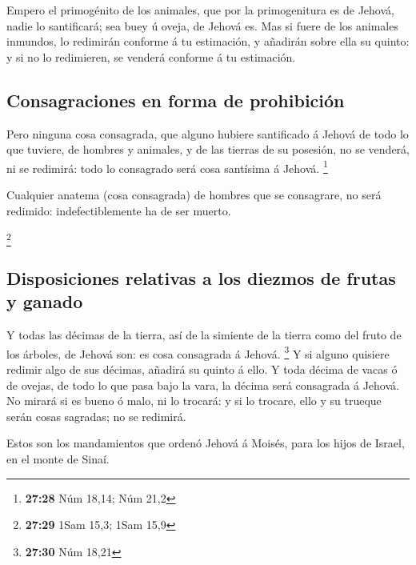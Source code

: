  Empero el primogénito de los animales, que por la
primogenitura es de Jehová, nadie lo santificará; sea buey ú oveja, de
Jehová es.  Mas si fuere de los animales inmundos, lo
redimirán conforme á tu estimación, y añadirán sobre ella su quinto: y
si no lo redimieren, se venderá conforme á tu estimación.

\hypertarget{consagraciones-en-forma-de-prohibiciuxf3n}{%
\subsection{Consagraciones en forma de
prohibición}\label{consagraciones-en-forma-de-prohibiciuxf3n}}

 Pero ninguna cosa consagrada, que alguno hubiere
santificado á Jehová de todo lo que tuviere, de hombres y animales, y de
las tierras de su posesión, no se venderá, ni se redimirá: todo lo
consagrado será cosa santísima á Jehová. \footnote{\textbf{27:28} Núm
  18,14; Núm 21,2}

 Cualquier anatema (cosa consagrada) de hombres que se
consagrare, no será redimido: indefectiblemente ha de ser muerto.

\footnote{\textbf{27:29} 1Sam 15,3; 1Sam 15,9}

\hypertarget{disposiciones-relativas-a-los-diezmos-de-frutas-y-ganado}{%
\subsection{Disposiciones relativas a los diezmos de frutas y
ganado}\label{disposiciones-relativas-a-los-diezmos-de-frutas-y-ganado}}

 Y todas las décimas de la tierra, así de la simiente de
la tierra como del fruto de los árboles, de Jehová son: es cosa
consagrada á Jehová. \footnote{\textbf{27:30} Núm 18,21} 
Y si alguno quisiere redimir algo de sus décimas, añadirá su quinto á
ello.  Y toda décima de vacas ó de ovejas, de todo lo que
pasa bajo la vara, la décima será consagrada á Jehová. 
No mirará si es bueno ó malo, ni lo trocará: y si lo trocare, ello y su
trueque serán cosas sagradas; no se redimirá.

 Estos son los mandamientos que ordenó Jehová á Moisés,
para los hijos de Israel, en el monte de Sinaí.
